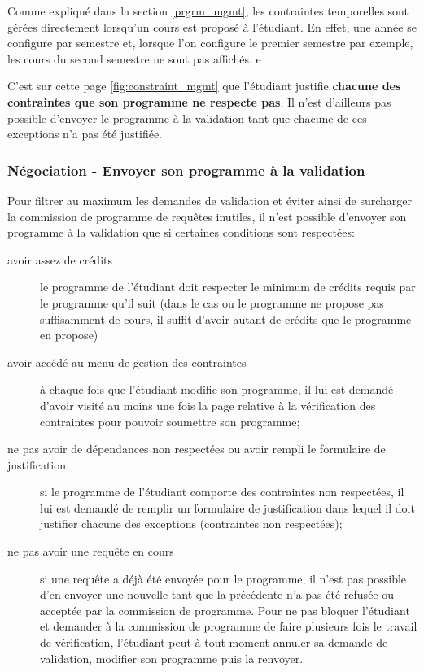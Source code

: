 Comme expliqué dans la section \ref{prgrm_mgmt}, les contraintes temporelles sont gérées directement lorsqu'un cours est proposé à l'étudiant. En effet, une année se configure par semestre et, lorsque l'on configure le premier semestre par exemple, les cours du second semestre ne sont pas affichés. e 

C'est sur cette page \ref{fig:constraint_mgmt} que l'étudiant justifie \textbf{chacune des contraintes que son programme ne respecte pas}. Il n'est d'ailleurs pas possible d'envoyer le programme à la validation tant que chacune de ces exceptions n'a pas été justifiée.

\subsubsection{Négociation - Envoyer son programme à la validation}
 \label{validation_request}
Pour filtrer au maximum les demandes de validation et éviter ainsi de surcharger la commission de programme de requêtes inutiles, il n'est possible d'envoyer son programme à la validation que si certaines conditions sont respectées:
\begin{description}
  \item[avoir assez de crédits] le programme de l'étudiant doit respecter le minimum de crédits requis par le programme qu'il suit (dans le cas ou le programme ne propose pas suffisamment de cours, il suffit d'avoir autant de crédits que le programme en propose)
  \item[avoir accédé au menu de gestion des contraintes] à chaque fois que l'étudiant modifie son programme, il lui est demandé d'avoir visité au moins une fois la page relative à la vérification des contraintes pour pouvoir soumettre son programme;
  \item[ne pas avoir de dépendances non respectées ou avoir rempli le formulaire de justification] si le programme de l'étudiant comporte des contraintes non respectées, il lui est demandé de remplir un formulaire de justification dans lequel il doit justifier chacune des exceptions (contraintes non respectées);
  \item[ne pas avoir une requête en cours] si une requête a déjà été envoyée pour le programme, il n'est pas possible d'en envoyer une nouvelle tant que la précédente n'a pas été refusée ou acceptée par la commission de programme. Pour ne pas bloquer l'étudiant et demander à la commission de programme de faire plusieurs fois le travail de vérification, l'étudiant peut à tout moment annuler sa demande de validation, modifier son programme puis la renvoyer. 
\end{description} 


